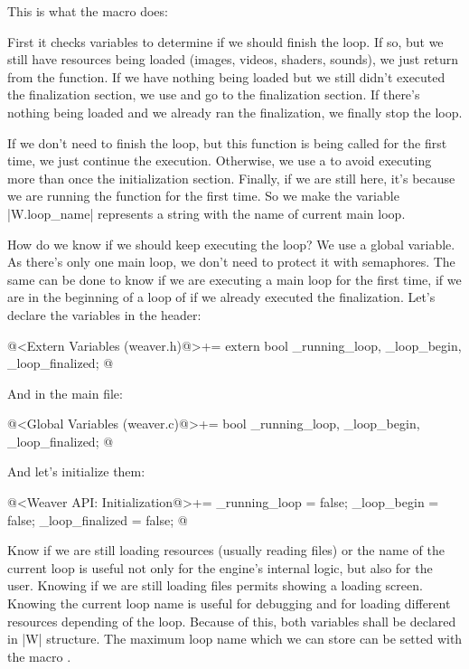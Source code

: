 
This is what the macro  does:

First it checks variables to determine if we should finish the
loop. If so, but we still have resources being loaded (images, videos,
shaders, sounds), we just return from the function. If we have nothing
being loaded but we still didn't executed the finalization section, we
use  and go to the finalization section. If there's
nothing being loaded and we already ran the finalization, we finally
stop the loop.

If we don't need to finish the loop, but this function is being called
for the first time, we just continue the execution. Otherwise, we use
a  to avoid executing more than once the
initialization section. Finally, if we are still here, it's because we
are running the function for the first time. So we make the variable
|W.loop_name| represents a string with the name of current main loop.

How do we know if we should keep executing the loop? We use a global
variable. As there's only one main loop, we don't need to protect it
with semaphores. The same can be done to know if we are executing a
main loop for the first time, if we are in the beginning of a loop of
if we already executed the finalization. Let's declare the variables
in the header:

\iniciocodigo
@<Extern Variables (weaver.h)@>+=
extern bool _running_loop, _loop_begin, _loop_finalized;
@
\fimcodigo

And in the main file:

\iniciocodigo
@<Global Variables (weaver.c)@>+=
bool _running_loop, _loop_begin, _loop_finalized;
@
\fimcodigo

And let's initialize them:

\iniciocodigo
@<Weaver API: Initialization@>+=
_running_loop = false;
_loop_begin = false;
_loop_finalized = false;
@
\fimcodigo

Know if we are still loading resources (usually reading files) or the
name of the current loop is useful not only for the engine's internal
logic, but also for the user. Knowing if we are still loading files
permits showing a loading screen. Knowing the current loop name is
useful for debugging and for loading different resources depending of
the loop. Because of this, both variables shall be declared in |W|
structure. The maximum loop name which we can store can be setted with
the macro .

